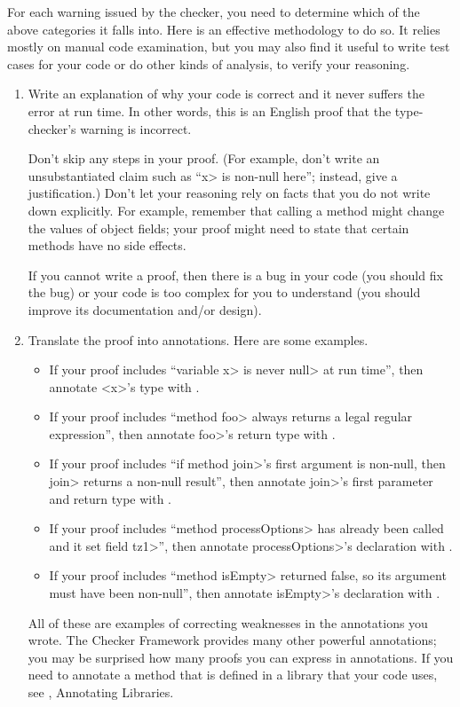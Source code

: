 For each warning issued by the checker, you need to determine which of the
above categories it falls into.  Here is an effective methodology to do so.
It relies mostly on manual code examination, but you may also find it
useful to write test cases for your code or do other kinds of analysis, to
verify your reasoning.

\begin{enumerate}
\item
  Write an explanation of why your code is correct and it
  never suffers the error at run time.  In other words, this is an English proof
  that the type-checker's warning is incorrect.

  Don't skip any steps in your proof.
  (For example, don't write an unsubstantiated claim such as ``\<x> is
  non-null here''; instead, give a justification.)
  Don't let your reasoning rely on
  facts that you do not write down explicitly.  For example, remember that
  calling a method might change the values of object fields; your proof
  might need to state that certain methods have no side effects.

  If you cannot write a proof, then there is a bug
  in your code (you should fix the bug) or your code is too complex for you
  to understand (you should improve its documentation and/or design).

\item
  Translate the proof into annotations.  Here are some examples.

  \begin{itemize}
  \item
    If your proof includes ``variable \<x> is never \<null>
    at run time'', then annotate <x>'s type with
    .
  \item
    If your proof
    includes ``method \<foo> always returns a legal regular expression'',
    then annotate \<foo>'s return type with
    .
  \item
    If your proof includes ``if method \<join>'s first argument is
    non-null, then \<join> returns a non-null result'', then annotate
    \<join>'s first parameter and return type with
    .
  \item
    If your proof includes ``method \<processOptions> has already been called and it
    set field \<tz1>'', then annotate \<processOptions>'s declaration with
    .
  \item
    If your proof includes ``method \<isEmpty> returned false, so its
    argument must have been non-null'', then annotate \<isEmpty>'s
    declaration with
    .
  \end{itemize}
  All of these are examples of correcting weaknesses in the annotations you wrote.
  The Checker Framework provides many other powerful annotations; you may
  be surprised how many proofs you can express in annotations.
  If you need to annotate a method that is defined in a
  library that your code uses, see ,
  Annotating Libraries.


\end{enumerate}
